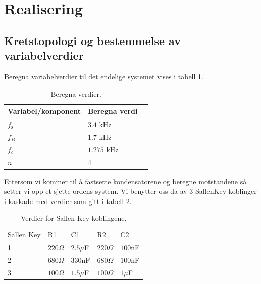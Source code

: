\newpage
\section{Realisering}
\label{realiseringOgTest}

\subsection{Kretstopologi og bestemmelse av variabelverdier}

Beregna variabelverdier til det endelige systemet vises i tabell \ref{tab:vars}.

\vspace{1cm}
\begin{table}[!h]
\centering %
\caption{Beregna verdier.}
\label{tab:vars}	%
\begin{tabular}{lll} %
\toprule %
\textbf{Variabel/komponent} & \textbf{Beregna verdi} \\
\midrule
$f_\text{s}$ & $3.4\text{ kHz}$ \\
$f_B$ & $1.7\text{ kHz}$ \\
$f_c$ & $1.275\text{ kHz}$ \\
$n$ & $4$ \\
\bottomrule 
\end{tabular}
\end{table}
\vspace{1cm}

Ettersom vi kommer til å fastsette kondensatorene og beregne motstandene så setter vi opp et sjette ordens system. Vi benytter oss da av 3 SallenKey-koblinger i kaskade med verdier som gitt i tabell \ref{tab:verdier}.

\begin{table}[!h]
    \centering
    \caption{Verdier for Sallen-Key-koblingene.}
    \label{tab:verdier}
    \begin{tabular}{lllll}
    Sallen Key & R1  & C1  & R2  & C2  \\
    1          & $220\Omega$ & $2.5\mu$F & $220\Omega$ & $100$nF \\
    2          & $680\Omega$ & $330$nF & $680\Omega$ & $100$nF \\
    3          & $100\Omega$ & $1.5\mu$F & $100\Omega$ & $1\mu$F  
    \end{tabular}
    \end{table}

